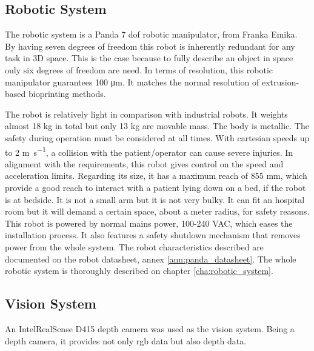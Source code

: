 \subsection*{Robotic System}
\label{subsec:system_architecture_components_robotic_system}

The robotic system is a Panda 7 \gls{dof} robotic manipulator, from Franka Emika. By having seven degrees of freedom this robot is inherently redundant for any task in 3D space. This is the case because to fully describe an object in space only six degrees of freedom are need. In terms of resolution, this robotic manipulator guarantees 100 \si{\micro\meter}. It matches the normal resolution of extrusion-based bioprinting methods.

The robot is relatively light in comparison with industrial robots. It weights almost 18 kg in total but only 13 kg are movable mass. The body is metallic. The safety during operation must be considered at all times. With cartesian speeds up to 2 \si{\meter\per\second}, a collision with the patient/operator can cause severe injuries. In alignment with the requirements, this robot gives control on the speed and acceleration limits. Regarding its size, it has a maximum reach of 855 mm, which provide a good reach to interact with a patient lying down on a bed, if the robot is at bedside. It is not a small arm but it is not very bulky. It can fit an hospital room but it will demand a certain space, about a meter radius, for safety reasons. This robot is powered by normal mains power, 100-240 VAC, which eases the installation process. It also features a safety shutdown mechanism that removes power from the whole system. The robot characteristics described are documented on the robot datasheet, annex \ref{ann:panda_datasheet}. The whole robotic system is thoroughly described on chapter \ref{cha:robotic_system}.


\subsection*{Vision System}
\label{subsec:system_architecture_components_vision_system}

An Intel\textregistered RealSense\texttrademark{} D415 depth camera was used as the vision system. Being a depth camera, it provides not only \gls{rgb} data but also depth data.

